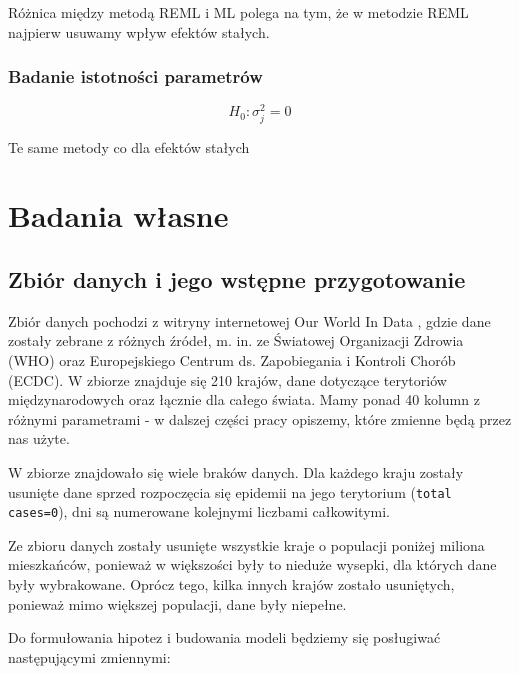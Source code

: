 \documentclass[12pt]{mwbk}
\theoremstyle{plain}
\theoremstyle{definition}
\theoremstyle{remark}
\begin{document}
Różnica między metodą REML i ML polega na tym, że w metodzie REML najpierw usuwamy wpływ efektów stałych.

\subsection{Badanie istotności parametrów}

$$H_0: \sigma^2_j=0$$

Te same metody co dla efektów stałych

\chapter{Badania własne}
\section{Zbiór danych i jego wstępne przygotowanie}

Zbiór danych pochodzi z witryny internetowej Our World In Data \cite{owid}, gdzie dane zostały zebrane z różnych źródeł, m. in. ze Światowej Organizacji Zdrowia (WHO) oraz Europejskiego Centrum ds. Zapobiegania i Kontroli Chorób (ECDC). W zbiorze znajduje się 210 krajów, dane dotyczące terytoriów międzynarodowych oraz łącznie dla całego świata. Mamy ponad 40 kolumn z różnymi parametrami - w dalszej części pracy opiszemy, które zmienne będą przez nas użyte.

W zbiorze znajdowało się wiele braków danych. Dla każdego kraju zostały usunięte dane sprzed rozpoczęcia się epidemii na jego terytorium (\texttt{total cases=0}), dni są numerowane kolejnymi liczbami całkowitymi.

Ze zbioru danych zostały usunięte wszystkie kraje o populacji poniżej miliona mieszkańców, ponieważ w większości były to nieduże wysepki, dla których dane były wybrakowane. Oprócz tego, kilka innych krajów zostało usuniętych, ponieważ mimo większej populacji, dane były niepełne.

Do formułowania hipotez i budowania modeli będziemy się posługiwać następującymi zmiennymi:
\end{document}

